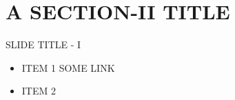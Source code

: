 


\maketitle
\section{A SECTION-II TITLE}
\begin{frame}[t]{SLIDE TITLE - I}
	\begin{itemize}
		\item ITEM 1
		SOME LINK
		\item ITEM 2
	\end{itemize}
	
\end{frame}



